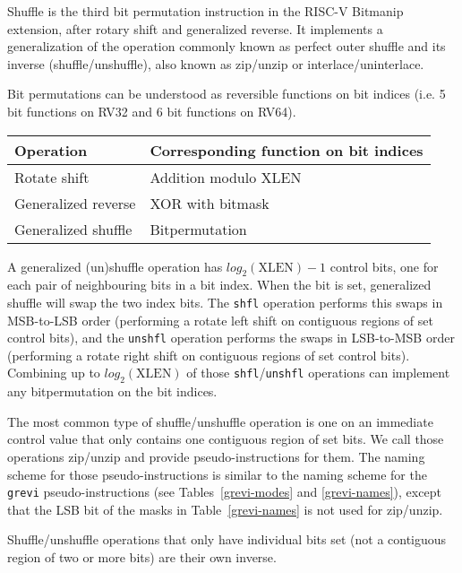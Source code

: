 Shuffle is the third bit permutation instruction in the RISC-V Bitmanip
extension, after rotary shift and generalized reverse. It implements a
generalization of the operation commonly known as perfect outer shuffle and its
inverse (shuffle/unshuffle), also known as zip/unzip or interlace/uninterlace.

Bit permutations can be understood as reversible functions on bit indices (i.e.
5 bit functions on RV32 and 6 bit functions on RV64).

\begin{center}
\begin{tabular}{l l}
Operation & Corresponding function on bit indices \\
\hline
Rotate shift & Addition modulo {\rm XLEN} \\
Generalized reverse & XOR with bitmask \\
Generalized shuffle & Bitpermutation \\
\end{tabular}
\end{center}

A generalized (un)shuffle operation has $log_2(\textrm{XLEN})-1$ control bits,
one for each pair of neighbouring bits in a bit index. When the bit is set,
generalized shuffle will swap the two index bits. The {\tt shfl} operation
performs this swaps in MSB-to-LSB order (performing a rotate left shift on
contiguous regions of set control bits), and the {\tt unshfl} operation performs
the swaps in LSB-to-MSB order (performing a rotate right shift on contiguous
regions of set control bits). Combining up to $log_2(\textrm{XLEN})$ of those
{\tt shfl}/{\tt unshfl} operations can implement any bitpermutation on the
bit indices.

The most common type of shuffle/unshuffle operation is one on an immediate
control value that only contains one contiguous region of set bits. We call
those operations zip/unzip and provide pseudo-instructions for them. The naming
scheme for those pseudo-instructions is similar to the naming scheme for the
{\tt grevi} pseudo-instructions (see Tables~\ref{grevi-modes} and
\ref{grevi-names}), except that the LSB bit of the masks in Table~\ref{grevi-names}
is not used for zip/unzip.

Shuffle/unshuffle operations that only have individual bits set (not a contiguous
region of two or more bits) are their own inverse.

